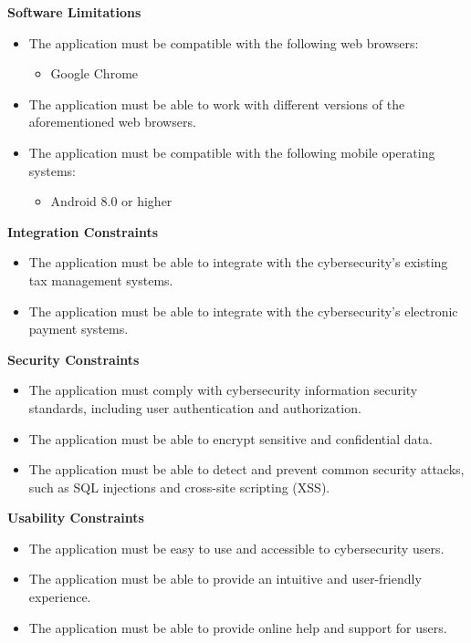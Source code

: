 \documentclass[12pt,a4paper, twosite]{article}
\begin{document}
\textbf{Software Limitations}
\begin{itemize}
    \item The application must be compatible with the following web browsers:
    \begin{itemize}
        \item Google Chrome
    \end{itemize}
    
    \item The application must be able to work with different versions of the aforementioned web browsers.
    \item The application must be compatible with the following mobile operating systems:
    \begin{itemize}
        \item Android 8.0 or higher
    \end{itemize}
\end{itemize}
   
\textbf{Integration Constraints}    
\begin{itemize}
    \item The application must be able to integrate with the cybersecurity's existing tax management systems.
    \item The application must be able to integrate with the cybersecurity's electronic payment systems.
\end{itemize}

\textbf{Security Constraints}    
\begin{itemize}
    \item The application must comply with cybersecurity information security standards, including user authentication and authorization.
    \item The application must be able to encrypt sensitive and confidential data.
    \item The application must be able to detect and prevent common security attacks, such as SQL injections and cross-site scripting (XSS).
\end{itemize}

\textbf{Usability Constraints}    
\begin{itemize}
    \item The application must be easy to use and accessible to cybersecurity users.
    \item The application must be able to provide an intuitive and user-friendly experience.
    \item The application must be able to provide online help and support for users.
\end{itemize}
\end{document}
